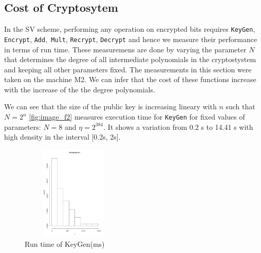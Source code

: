 \documentclass{acm_proc_article-sp}
\begin{document}
\subsection{Cost of Cryptosytem}
 In the SV scheme, performing any operation on encrypted bits requires  \texttt{KeyGen}, \texttt{Encrypt}, \texttt{Add},\texttt{ Mult}, \texttt{Recrypt}, \texttt{Decrypt} and hence we measure their performance in terms of run time. These measuremens are done by varying the parameter $N$ that determines the degree of all intermediate polynomials in the cryptostystem and keeping all other parameters fixed. The measurements in this section were taken on the machine M2. We can infer that the cost of these functions increase with the increase of the the degree  polynomials. 

\begin{table}[htb]
  \centering
  \caption{Run time (ms)}
\end{table}

We can see that the size of the public key is increasing lineary with $n$ such that $N=2^n$ 
\autoref{fig:image_f2} measures execution time for \texttt{KeyGen} for fixed values of parameters: $N=8$ and $\eta = 2^{384}$. It shows a variation from 0.2 s to 14.41 s with high density in the interval [0.2s, 2s].

\begin{figure}[!h] %
\centering
\includegraphics[width=5cm, height=4.5cm]{f3.pdf} 
\caption{Run time of KeyGen(ms)} 
\label{fig:image_f2} %
\end{figure}
\end{document}
